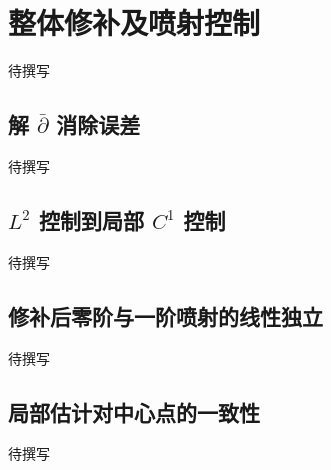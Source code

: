 
% 
% 

\section{整体修补及喷射控制}
\label{g4:sec:1903}

待撰写

\subsection{\texorpdfstring{解 \(\bar{\partial}\) 消除误差}{解 \={∂} 消除误差}}
\label{g4:subsec:1903:01}
待撰写

\subsection{\texorpdfstring{\(L^2\) 控制到局部 \(C^1\) 控制}{L² 控制到局部 C¹ 控制}}
\label{g4:subsec:1903:02}
待撰写

\subsection{修补后零阶与一阶喷射的线性独立}
\label{g4:subsec:1903:03}
待撰写

\subsection{局部估计对中心点的一致性}
\label{g4:subsec:1903:04}
待撰写
